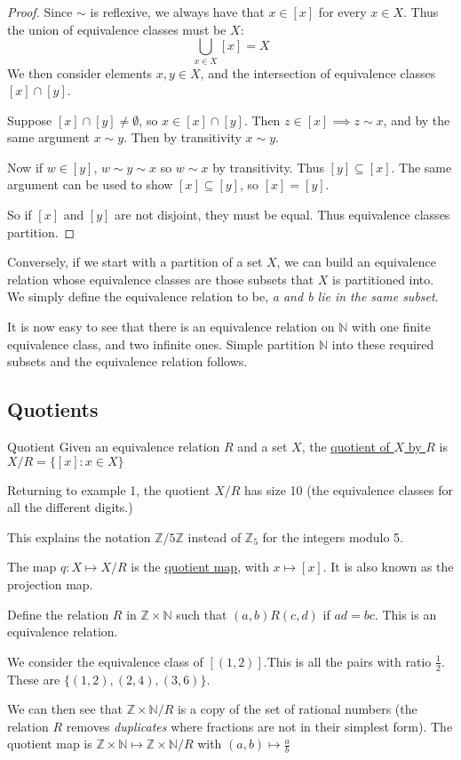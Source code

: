 \documentclass[../Main.tex]{subfiles}
\begin{document}
\begin{proof}
    Since $\sim$ is reflexive, we always have that $x \in [x]$ for every $x \in X$. Thus the union of equivalence classes must be $X$:
    \begin{equation*}
        \bigcup_{x \in X} [x] = X
    \end{equation*}
    We then consider elements $x, y \in X$, and the intersection of equivalence classes $[x] \cap [y]$.\par
    Suppose $[x] \cap [y] \neq \emptyset$, so $x \in [x] \cap [y]$. Then $z \in [x] \implies z \sim x$, and by the same argument $x \sim y$. Then by transitivity $x \sim y$.\par
    Now if $w \in [y]$, $w \sim y \sim x$ so $w \sim x$ by transitivity. Thus $[y] \subseteq [x]$. The same argument can be used to show $[x] \subseteq [y]$, so $[x] = [y]$.\par
    So if $[x]$ and $[y]$ are not disjoint, they must be equal. Thus equivalence classes partition.
\end{proof}
Conversely, if we start with a partition of a set $X$, we can build an equivalence relation whose equivalence classes are those subsets that $X$ is partitioned into. We simply define the equivalence relation to be, \textit{a and b lie in the same subset}.\par
It is now easy to see that there is an equivalence relation on $\mathbb{N}$ with one finite equivalence class, and two infinite ones. Simple partition $\mathbb{N}$ into these required subsets and the equivalence relation follows.
\subsection{Quotients}
\begin{definition}{Quotient}
    Given an equivalence relation $R$ and a set $X$, the \underline{quotient of $X$ by $R$} is $X / R = \{[x] : x \in X\}$
\end{definition}
Returning to example 1, the quotient $X / R$ has size 10 (the equivalence classes for all the different digits.)\par %
This explains the notation $\mathbb{Z} / 5\mathbb{Z}$ instead of $\mathbb{Z}_5$ for the integers modulo 5.\par
The map $q : X \mapsto X / R$ is the \underline{quotient map}, with $x \mapsto [x]$. It is also known as the projection map.
\begin{example}
    Define the relation $R$ in $\mathbb{Z} \times \mathbb{N}$ such that $(a, b)R(c, d)$ if $ad = bc$. This is an equivalence relation.\par
    We consider the equivalence class of $[(1, 2)]$.This is all the pairs with ratio $\frac{1}{2}$. These are $\{(1, 2), (2, 4), (3, 6)\}$.\par
    We can then see that $\mathbb{Z} \times \mathbb N / R$ is a copy of the set of rational numbers (the relation $R$ removes \textit{duplicates} where fractions are not in their simplest form). The quotient map is $\mathbb{Z} \times \mathbb{N} \mapsto \mathbb{Z} \times \mathbb{N} / R$ with $(a, b) \mapsto \frac{a}{b}$
\end{example}
\end{document}
